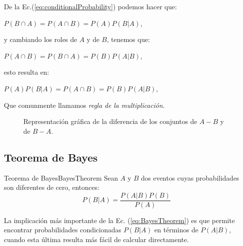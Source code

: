 De la Ec.(\ref{eq:conditionalProbability}) podemos hacer que:

\begin{center}
$P(B \cap A) = P(A \cap B) = P(A)P(B|A)$, 
\end{center}

y cambiando los roles de $A$ y de $B$, tenemos que:

\begin{center}
    $P(A \cap B) = P(B \cap A) = P(B)P(A|B)$, 
\end{center}

esto resulta en:

\begin{center}
    $P(A)P(B|A) = P(A \cap B) = P(B)P(A|B)$,
\end{center}

Que comunmente llamamos \textit{regla de la multiplicación}.

\begin{figure}
\centering
{}
\caption{Representación gráfica de la diferencia de los conjuntos de $A-B$ y de $B-A$.}
\label{fig:difer}
\end{figure}

\subsection{Teorema de Bayes}

\begin{theorem}{Teorema de Bayes}{BayesTheorem}
Sean $A$ y $B$ dos eventos cuyas probabilidades son diferentes de cero,
entonces:
    \begin{equation}
        P(B|A) = \frac{P(A|B) P(B)}{P(A)}
        \label{eq:BayesTheorem}
    \end{equation}

La implicación más importante de la Ec. (\ref{eq:BayesTheorem}) es que permite
encontrar probabilidades condicionadas $P(B|A)$ en términos de $P(A|B)$, cuando
esta última resulta más fácil de calcular directamente.
\end{theorem}
